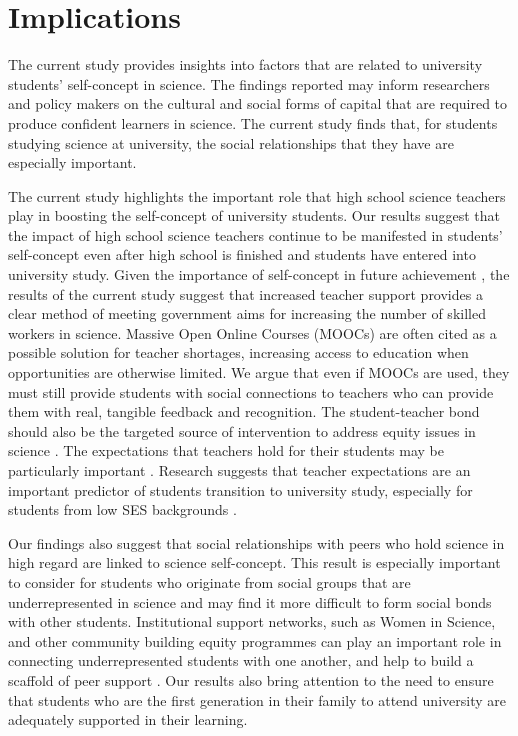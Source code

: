 \section*{Implications}
The current study provides insights into factors that are related to university students' self-concept in science. The findings reported may inform researchers and policy makers on the cultural and social forms of capital that are required to produce confident learners in science. The current study finds that, for students studying science at university, the social relationships that they have are especially important.

The current study highlights the important role that high school science teachers play in boosting the self-concept of university students. Our results suggest that the impact of high school science teachers continue to be manifested in students' self-concept even after high school is finished and students have entered into university study. Given the importance of self-concept in future achievement \citep{uccar2017role,chang2008science}, the results of the current study suggest that increased teacher support provides a clear method of meeting government aims for increasing the number of skilled workers in science. Massive Open Online Courses (MOOCs) are often cited as a possible solution for teacher shortages, increasing access to education when opportunities are otherwise limited. We argue that even if MOOCs are used, they must still provide students with social connections to teachers who can provide them with real, tangible feedback and recognition. The student-teacher bond should also be the targeted source of intervention to address equity issues in science \citep{banerjee2016systematic}. The expectations that teachers hold for their students may be particularly important \citep{rubie2006teacher}. Research suggests that teacher expectations are an important predictor of students transition to university study, especially for students from low SES backgrounds \citep{gregory2013takes}. 

Our findings also suggest that social relationships with peers who hold science in high regard are linked to science self-concept. This result is especially important to consider for students who originate from social groups that are underrepresented in science and may find it more difficult to form social bonds with other students. Institutional support networks, such as Women in Science, and other community building equity programmes can play an important role in connecting underrepresented students with one another, and help to build a scaffold of peer support \citep{ong2018counterspaces}. Our results also bring attention to the need to ensure that students who are the first generation in their family to attend university are adequately supported in their learning.  

